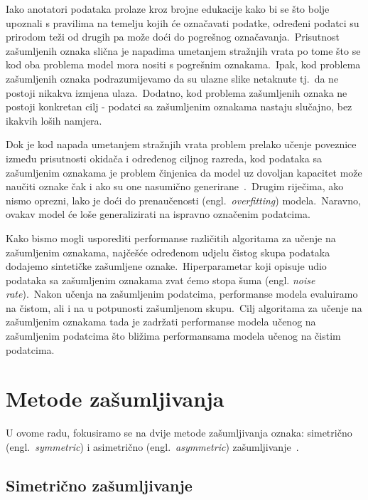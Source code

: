 \documentclass[diplomskirad]{fer}
\begin{document}
Iako anotatori podataka prolaze kroz brojne edukacije kako bi se što bolje upoznali s pravilima na temelju kojih će označavati podatke, određeni podatci su prirodom teži od drugih pa može doći do pogrešnog označavanja.\ 
Prisutnost zašumljenih oznaka slična je napadima umetanjem stražnjih vrata po tome što se kod oba problema model mora nositi s pogrešnim oznakama.\ Ipak, kod problema zašumljenih oznaka podrazumijevamo da su ulazne slike netaknute tj.\ da ne postoji nikakva izmjena ulaza.\ 
Dodatno, kod problema zašumljenih oznaka ne postoji konkretan cilj - podatci sa zašumljenim oznakama nastaju slučajno, bez ikakvih loših namjera.\ 
  
Dok je kod napada umetanjem stražnjih vrata problem prelako učenje poveznice između prisutnosti okidača i određenog ciljnog razreda, kod podataka sa zašumljenim oznakama je problem činjenica da model uz dovoljan kapacitet može naučiti oznake čak i ako su one nasumično generirane~\cite{zhang2016understanding}.\ 
Drugim riječima, ako nismo oprezni, lako je doći do prenaučenosti (engl.\ \textit{overfitting}) modela.\ Naravno, ovakav model će loše generalizirati na ispravno označenim podatcima.\ 
  
Kako bismo mogli usporediti performanse različitih algoritama za učenje na zašumljenim oznakama, najčešće određenom udjelu čistog skupa podataka dodajemo sintetičke zašumljene oznake.\ 
Hiperparametar koji opisuje udio podataka sa zašumljenim oznakama zvat ćemo stopa šuma (engl. \textit{noise rate}).\ Nakon učenja na zašumljenim podatcima, performanse modela evaluiramo na čistom, ali i na u potpunosti zašumljenom skupu.\ 
Cilj algoritama za učenje na zašumljenim oznakama tada je zadržati performanse modela učenog na zašumljenim podatcima što bližima performansama modela učenog na čistim podatcima.\ 

\section{Metode zašumljivanja}
\label{sek:metode_zasumljivanja}

U ovome radu, fokusiramo se na dvije metode zašumljivanja oznaka: simetrično (engl.\ \textit{symmetric}) i asimetrično (engl.\ \textit{asymmetric}) zašumljivanje~\cite{cordeiro2020survey}.\

\subsection{Simetrično zašumljivanje}
\label{sub:sim}
\end{document}
